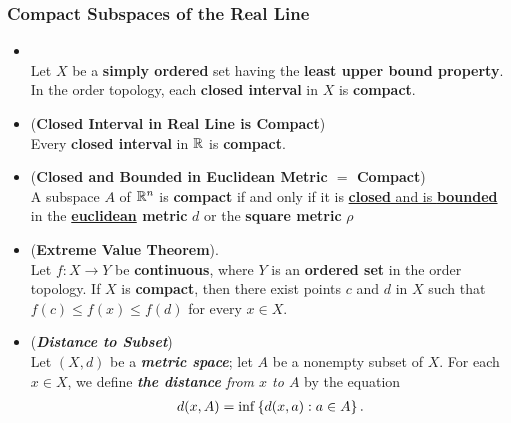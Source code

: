 \documentclass[11pt]{article}
\begin{document}
\subsubsection{Compact Subspaces of the Real Line}
\begin{itemize}
\item \begin{theorem}\citep{munkres2000topology}\\
Let $X$ be a \textbf{simply ordered} set having the \textbf{least upper bound property}. In the order topology, each \textbf{closed interval} in $X$ is \textbf{compact}.
\end{theorem}

\item \begin{corollary} (\textbf{Closed Interval in Real Line is Compact})\citep{munkres2000topology}\\
Every \textbf{closed interval} in ${\mathbb R}$ is \textbf{compact}.
\end{corollary}

\item \begin{proposition}  (\textbf{Closed and Bounded in Euclidean Metric $=$ Compact})\citep{munkres2000topology}\\
A subspace $A$ of ${\mathbb R}^n$ is \textbf{compact} if and only if it is \underline{\textbf{closed} and is \textbf{bounded}} in the \textbf{\underline{euclidean} metric} $d$ or the \textbf{square metric} $\rho$
\end{proposition}

\item \begin{theorem} (\textbf{Extreme Value Theorem}). \citep{munkres2000topology} \\
Let $f : X \rightarrow Y$ be \textbf{continuous}, where $Y$ is an \textbf{ordered set} in the order topology. If $X$ is \textbf{compact}, then there exist points $c$ and $d$ in $X$ such that $f(c) \le f(x) \le f (d)$ for every $x \in X$.
\end{theorem}

\item \begin{definition} (\emph{\textbf{Distance to Subset}})\\
Let $(X, d)$ be a \emph{\textbf{metric space}}; let $A$ be a nonempty subset of $X$. For each $x \in X$, we define \emph{\textbf{the distance} from $x$ to $A$} by the equation
\begin{align*}
d(x, A) = \inf\left\{d(x, a): a \in A\right\}.
\end{align*}
\end{definition}


\end{itemize}
\end{document}
